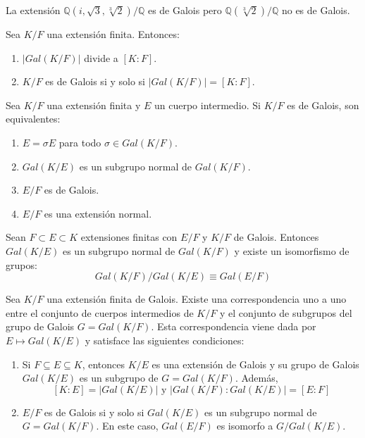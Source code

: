 \begin{example}
    La extensión $\mathbb{Q}(i, \sqrt{3}, \sqrt[3]{2})/\mathbb{Q}$ es de Galois pero $\mathbb{Q}(\sqrt[3]{2})/\mathbb{Q}$ no es de Galois.
\end{example}

\begin{theorem}
    Sea $K/F$ una extensión finita. Entonces:
    \begin{enumerate}
        \item $|Gal(K/F)|$ divide a $[K : F]$.
        \item $K/F$ es de Galois si y solo si $|Gal(K/F)| = [K : F]$.
    \end{enumerate}
\end{theorem}

\begin{theorem}
    Sea $K/F$ una extensión finita y $E$ un cuerpo intermedio. Si $K/F$ es de Galois, son equivalentes:
    \begin{enumerate}
        \item $E = \sigma E$ para todo $\sigma \in Gal(K/F)$.
        \item $Gal(K/E)$ es un subgrupo normal de $Gal(K/F)$.
        \item $E/F$ es de Galois.
        \item $E/F$ es una extensión normal.
    \end{enumerate}
\end{theorem}

\begin{theorem}
    Sean $F \subset E \subset K$ extensiones finitas con $E/F$ y $K/F$ de Galois.
    Entonces $Gal(K/E)$ es un subgrupo normal de $Gal(K/F)$ y existe un isomorfismo de grupos:
    $$Gal(K/F)/Gal(K/E) \equiv Gal(E/F)$$
\end{theorem}

\begin{theorem}
    Sea $K/F$ una extensión finita de Galois.
    Existe una correspondencia uno a uno entre el conjunto de cuerpos intermedios de $K/F$ y el conjunto de subgrupos del grupo de Galois $G = Gal(K/F)$.
    Esta correspondencia viene dada por $E \mapsto Gal(K/E)$ y satisface las siguientes condiciones:
    \begin{enumerate}
        \item Si $F \subseteq E \subseteq K$, entonces $K/E$ es una extensión de Galois y su grupo de Galois $Gal(K/E)$ es un subgrupo de $G = Gal(K/F)$. Además, $$[K : E] = |Gal(K/E)| \text{ y } |Gal(K/F) : Gal(K/E)| = [E : F]$$
        \item $E/F$ es de Galois si y solo si $Gal(K/E)$ es un subgrupo normal de $G = Gal(K/F)$. En este caso, $Gal(E/F)$ es isomorfo a $G/Gal(K/E)$.
    \end{enumerate}
\end{theorem}